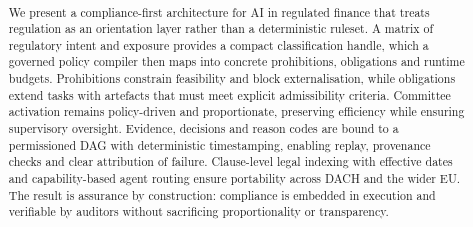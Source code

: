 \documentclass[oneside,10pt]{swissi}
\title{\papertitle \\[0.35em]
\normalsize \papersubtitle}
\author{{\fontsize{8}{10}\selectfont\paperauthors}\\[0.9em]
{\scriptsize\paperaffiliations}}
\date{\vspace{1.5em}}
\begin{document}
\maketitle

\begin{abstract}
We present a compliance-first architecture for AI in regulated finance that treats regulation as an orientation layer rather than a deterministic ruleset. A matrix of regulatory intent and exposure provides a compact classification handle, which a governed policy compiler then maps into concrete prohibitions, obligations and runtime budgets. Prohibitions constrain feasibility and block externalisation, while obligations extend tasks with artefacts that must meet explicit admissibility criteria. Committee activation remains policy-driven and proportionate, preserving efficiency while ensuring supervisory oversight. Evidence, decisions and reason codes are bound to a permissioned DAG with deterministic timestamping, enabling replay, provenance checks and clear attribution of failure. Clause-level legal indexing with effective dates and capability-based agent routing ensure portability across DACH and the wider EU. The result is assurance by construction: compliance is embedded in execution and verifiable by auditors without sacrificing proportionality or transparency.
\end{abstract}


\bigskip
\end{document}
